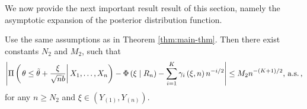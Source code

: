 We now provide the next important result result of this section, namely the asymptotic
expansion of the posterior distribution function.
\begin{theorem}
\label{thm:asym-exp-post-cdf} Use the same assumptions as in Theorem
\ref{thm:main-thm}. Then there exist constants $N_{2}$ and $M_{2}$,
such that 
\begin{equation}
\left|\Pi\left(\left.\theta\le\tilde{\theta}+\frac{\xi}{\sqrt{n}b}\right|X_{1},\ldots,X_{n}\right)-\Phi\left(\xi\mid R_{n}\right)-\sum_{i=1}^{K}\gamma_{i}\left(\xi,n\right)n^{-i/2}\right|\le M_{2}n^{-\left(K+1\right)/2},\,\mathrm{a.s.}\,,\label{eq:asym-exp-post-prob}
\end{equation}
for any $n\ge N_{2}$ and $\xi\in\left(Y_{\left(1\right)},Y_{\left(n\right)}\right)$. \end{theorem}
